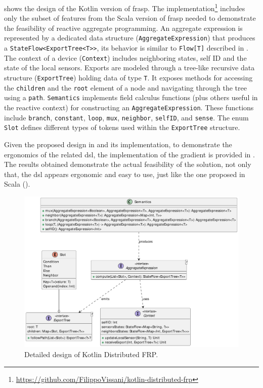  shows the design of the Kotlin version of \ac{frasp}. The implementation\footnote{\url{https://github.com/FilippoVissani/kotlin-distributed-frp}} includes only the subset of features from the Scala version of \ac{frasp} needed to demonstrate the feasibility of reactive aggregate programming. An aggregate expression is represented by a dedicated data structure (\texttt{AggregateExpression}) that produces a \texttt{StateFlow<ExportTree<T>>}, its behavior is similar to \texttt{Flow[T]} described in . The context of a device (\texttt{Context}) includes neighboring states, self ID and the state of the local sensors. Exports are modeled through a tree-like recursive data structure (\texttt{ExportTree}) holding data of type \texttt{T}. It exposes methods for accessing the \texttt{children} and the \texttt{root} element of a node and navigating through the tree using a \texttt{path}. \texttt{Semantics} implements field calculus functions (plus others useful in the reactive context) for constructing an \texttt{AggregateExpression}. These functions include \texttt{branch}, \texttt{constant}, \texttt{loop}, \texttt{mux}, \texttt{neighbor}, \texttt{selfID}, and \texttt{sense}. The enum \texttt{Slot} defines different types of tokens used within the \texttt{ExportTree} structure.

Given the proposed design in  and its implementation, to demonstrate the ergonomics of the related \ac{dsl}, the implementation of the gradient is provided in . The results obtained demonstrate the actual feasibility of the solution, not only that, the \ac{dsl} appears ergonomic and easy to use, just like the one proposed in Scala ().

\begin{figure}
    \centering
    \includegraphics[width=\linewidth]{figures/kotlin-distributed-frp-design.pdf}
    \caption{Detailed design of Kotlin Distributed FRP.}
    \label{fig:kotlin-distributed-frp-design}
\end{figure}

